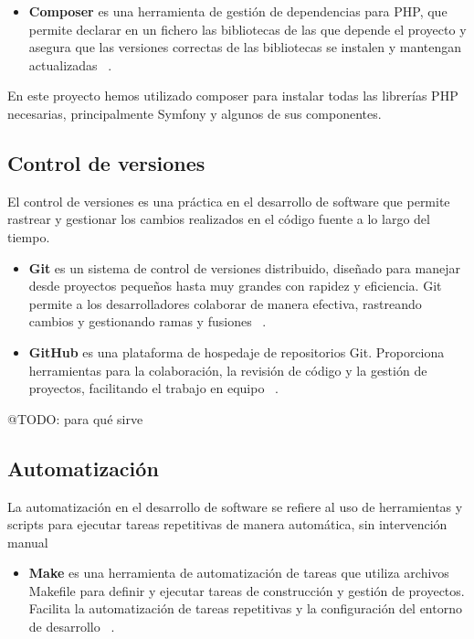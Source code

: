 \begin{itemize}
    \item \textbf{Composer}
    es una herramienta de gestión de dependencias para PHP, que permite declarar en un fichero las bibliotecas de las
    que depende el proyecto y asegura que las versiones correctas de las bibliotecas se instalen y mantengan
    actualizadas ~\cite{https://getcomposer.org/doc/}.
\end{itemize}

En este proyecto hemos utilizado composer para instalar todas las librerías PHP necesarias, principalmente Symfony y
algunos de sus componentes.

\subsection*{Control de versiones}

El control de versiones es una práctica en el desarrollo de software que permite rastrear y gestionar los cambios
realizados en el código fuente a lo largo del tiempo.

\begin{itemize}
    \item \textbf{Git}
    es un sistema de control de versiones distribuido, diseñado para manejar desde proyectos pequeños hasta muy grandes
    con rapidez y eficiencia.
    Git permite a los desarrolladores colaborar de manera efectiva, rastreando cambios y gestionando ramas y fusiones
    ~\cite{https://git-scm.com/doc}.
    \item \textbf{GitHub} es una plataforma de hospedaje de repositorios Git.
    Proporciona herramientas para la colaboración, la revisión de código y la gestión de proyectos, facilitando el
    trabajo en equipo ~\cite{https://docs.github.com/}.
\end{itemize}

\colorbox{color_highlight}{@TODO: para qué sirve}

\subsection*{Automatización}

La automatización en el desarrollo de software se refiere al uso de herramientas y scripts para ejecutar tareas
repetitivas de manera automática, sin intervención manual

\begin{itemize}
    \item \textbf{Make}
    es una herramienta de automatización de tareas que utiliza archivos Makefile para definir y ejecutar tareas de
    construcción y gestión de proyectos.
    Facilita la automatización de tareas repetitivas y la configuración del entorno de desarrollo
    ~\cite{https://www.gnu.org/software/make/manual/}.
\end{itemize}

